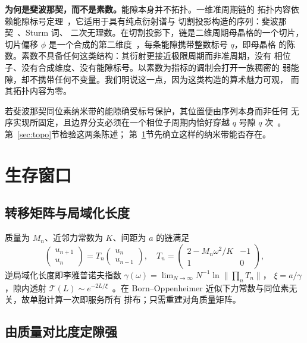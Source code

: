 \documentclass[11pt]{article}
\begin{document}
\textbf{为何是斐波那契，而不是素数。}能隙本身并不拓扑。一维准周期链的
拓扑内容依赖能隙标号定理~\cite{bellissard1992}，它适用于具有纯点衍射谱与
切割投影构造的序列：斐波那契~\cite{kohmoto1983,ostlund1983}、Sturm 词、
二次无理数。在切割投影下，链是二维周期母晶格的一个切片，切片偏移 $\phi$
是一个合成的第二维度~\cite{kraus2012}，每条能隙携带整数标号 $q$，即母晶格
的陈数。素数不具备任何这类结构：其衍射更接近极限周期而非准周期，没有
相位子、没有合成维度、没有能隙标号。以素数为指标的调制会打开一族稠密的
弱能隙，却不携带任何不变量。我们明说这一点，因为这类构造的算术魅力可观，
而其拓扑内容为零。

若斐波那契同位素纳米带的能隙确受标号保护，其位置便由序列本身而非任何
无序实现所固定，且边界分支必须在一个相位子周期内恰好穿越 $q$ 号隙 $q$
次~\cite{kraus2012,apigo2019}。第~\ref{sec:topo}节检验这两条陈述；
第~\ref{sec:survival}节先确立这样的纳米带能否存在。

\section{生存窗口}
\label{sec:survival}

\subsection{转移矩阵与局域化长度}

质量为 $M_n$、近邻力常数为 $K$、间距为 $a$ 的链满足
\begin{equation}
\begin{pmatrix} u_{n+1} \\ u_n \end{pmatrix} = T_n
\begin{pmatrix} u_n \\ u_{n-1} \end{pmatrix}, \quad
T_n = \begin{pmatrix} 2 - M_n\omega^2/K & -1 \\ 1 & 0 \end{pmatrix},
\end{equation}
逆局域化长度即李雅普诺夫指数
$\gamma(\omega) = \lim_{N\to\infty} N^{-1}\ln\|\prod_n T_n\|$，
$\xi = a/\gamma$，隙内透射
$\mathcal{T}(L) \sim e^{-2L/\xi}$~\cite{anderson1958}。在
Born--Oppenheimer 近似下力常数与同位素无关，故单胞计算一次即服务所有
排布；只需重建对角质量矩阵。

\subsection{由质量对比度定隙强}
\end{document}
